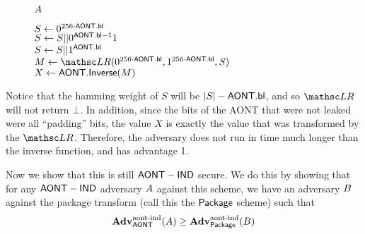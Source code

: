 \documentclass[11pt,twoside]{article}
\begin{document}
\begin{figure}[H]
{

\underline{$A$}

\begin{algorithm}[H]
$S\gets 0^{256\cdot\mathsf{AONT.bl}}$\\
{
$S\gets S||0^{\mathsf{AONT.bl}-1}1$\\
}
$S\gets S||1^{\mathsf{AONT.bl}}$\\

$M\gets \LRO(0^{256\cdot\schemefont{AONT.bl}},1^{256\cdot\schemefont{AONT.bl}},S)$\\
$X\gets \mathsf{AONT.Inverse}(M)$ \\
\end{algorithm}

}
\end{figure}

Notice that the hamming weight of $S$ will be $|S|-\mathsf{AONT.bl}$, and so $\LRO$ will not return $\bot$. In addition, since the bits of the AONT that were not leaked were all ``padding'' bits, the value $X$ is exactly the value that was transformed by the $\LRO$. Therefore, the adversary does not run in time much longer than the inverse function, and has advantage 1. 

Now we show that this is still $\mathsf{AONT-IND}$ secure. We do this by showing that for any $\mathsf{AONT-IND}$ adversary $A$ against this scheme, we have an adversary $B$ against the package transform (call this the $\mathsf{Package}$ scheme) such that $$\textbf{Adv}^\text{aont-ind}_\mathsf{AONT}(A)\ge\textbf{Adv}^\text{aont-ind}_\mathsf{Package}(B)$$
\end{document}
